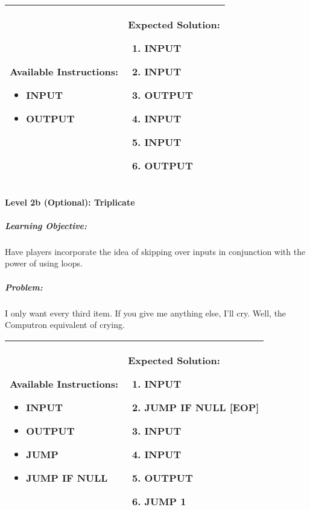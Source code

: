 \begin{center}
    \begin{tabular}{ | m{6cm} | m{8cm} | } 
        \hline
            \textbf{Available Instructions:} 
            \begin{itemize}
                \setlength\itemsep{-.35em}
                \item INPUT
                \item OUTPUT
            \end{itemize}& 
            \textbf{Expected Solution:} 
            \begin{enumerate}
                \setlength\itemsep{-.35em}
                \item INPUT
                \item INPUT
                \item OUTPUT
                \item INPUT
                \item INPUT
                \item OUTPUT
            \end{enumerate}
            \\
        \hline
    \end{tabular}
\end{center}


\paragraph{Level 2b (Optional): Triplicate}
\subparagraph{Learning Objective:} Have players incorporate the idea of skipping over inputs in conjunction with the power of using loops.

\subparagraph{Problem:} I only want every third item. If you give me anything else, I'll cry. Well, the Computron equivalent of crying.

\begin{center}
    \begin{tabular}{ | m{6cm} | m{8cm} | } 
        \hline
            \textbf{Available Instructions:} 
            \begin{itemize}
                \setlength\itemsep{-.35em}
                \item INPUT
                \item OUTPUT
		\item JUMP
		\item JUMP IF NULL
            \end{itemize}& 
            \textbf{Expected Solution:} 
            \begin{enumerate}
                \setlength\itemsep{-.35em}
                \item INPUT
		\item JUMP IF NULL [EOP]
		\item INPUT
		\item INPUT
                \item OUTPUT
		\item JUMP 1
            \end{enumerate}
            \\
        \hline
    \end{tabular}
\end{center}


